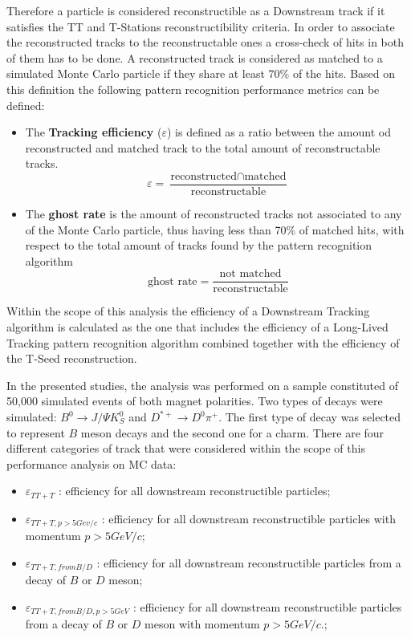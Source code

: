 Therefore a particle is considered reconstructible as a Downstream track if it satisfies the TT and T-Stations reconstructibility criteria. In order to associate the reconstructed tracks to the reconstructable ones a cross-check of hits in both of them has to be done. A reconstructed track is considered as matched to a simulated Monte Carlo particle if they share at least 70\% of the hits.  
Based on this definition the following pattern recognition performance metrics can be defined: 

\begin{itemize}
    \item The \textbf{Tracking efficiency} ($\varepsilon$) is defined as a ratio between the amount od reconstructed and matched track to the total amount of reconstructable tracks. 
    \begin{equation}
        \varepsilon  = \frac{\textrm{reconstructed} \cap  \textrm{matched}}{\textrm{reconstructable}}
    \end{equation}
    \item The \textbf{ghost rate} is the amount of reconstructed tracks not associated to any of the Monte Carlo particle, thus having less than 70\% of matched hits, with respect to the total amount of tracks found by the pattern recognition algorithm
    \begin{equation}
       \textrm{ghost rate} =  \frac{\textrm{not matched}}{\textrm{reconstructable}}
    \end{equation}
\end{itemize}

 Within the scope of this analysis the efficiency of a Downstream Tracking algorithm is calculated as the one that includes the efficiency of a Long-Lived Tracking pattern recognition algorithm combined together with the efficiency of the T-Seed reconstruction.

In the presented studies, the analysis was performed on a sample constituted of 50,000 simulated events of both magnet polarities. Two types of decays were simulated: $B^{0} \rightarrow J/\Psi K^{0}_{S}$ and $D^{*+} \rightarrow D^{0}\pi^+$. The first type of decay was selected to represent $B$ meson decays and the second one for a charm. 
There are four different categories of track that were considered within the scope of this performance analysis on MC data:

\begin{itemize}
    \item $\varepsilon_{TT+T}$ : efficiency for all downstream reconstructible particles;
    \item $\varepsilon_{TT+T, p>5Gev/c}$ : efficiency for all downstream reconstructible particles with momentum $p> 5 GeV/c$;
    \item $\varepsilon_{TT+T, from B/D}$ : efficiency for all downstream reconstructible particles from a decay of $B$ or $D$ meson;
    \item $\varepsilon_{TT+T, from B/D, p>5 GeV }$ : efficiency for all downstream reconstructible particles from a decay of $B$ or $D$ meson with momentum $p> 5 GeV/c$.;
\end{itemize}

